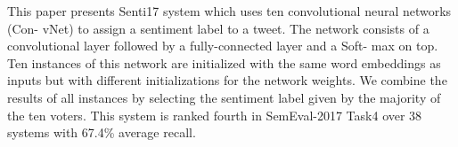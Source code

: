 This paper presents Senti17 system which uses ten convolutional neural networks (Con- vNet) to assign a sentiment label to a tweet. The network consists of a convolutional layer followed by a fully-connected layer and a Soft- max on top. Ten instances of this network are initialized with the same word embeddings  as inputs but with different initializations for the network weights. We combine the results of all instances by selecting the sentiment label given by the majority of the ten voters. This system is ranked fourth in SemEval-2017 Task4 over 38 systems with 67.4\% average recall.
